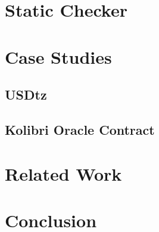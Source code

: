 \documentclass[a4paper,UKenglish]{dagrep-v2021}
\begin{document}
\section {Static Checker}
\section {Case Studies}
\subsection{USDtz}
\subsection{Kolibri Oracle Contract}
\section {Related Work}
\section {Conclusion}
\end{document}
